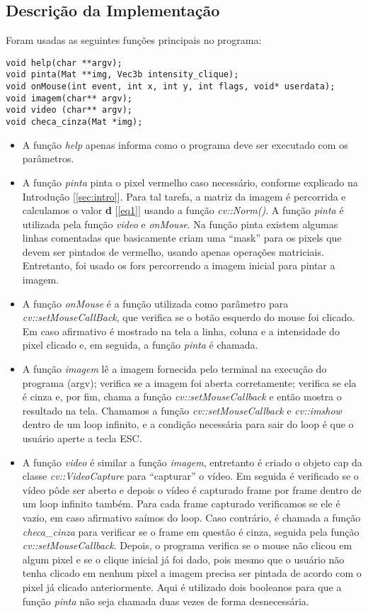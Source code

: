 \documentclass{bmvc2k}
\begin{document}
\subsection{Descrição da Implementação}
Foram usadas as seguintes funções principais no programa:
\begin{lstlisting}
void help(char **argv);
void pinta(Mat **img, Vec3b intensity_clique);
void onMouse(int event, int x, int y, int flags, void* userdata);
void imagem(char** argv);
void video (char** argv);
void checa_cinza(Mat *img);
\end{lstlisting}


\begin{itemize}
\item A função \textit{help} apenas informa como o programa deve ser executado com os parâmetros.
\item A função \textit{pinta} pinta o pixel vermelho caso necessário, conforme explicado na Introdução [\ref{sec:intro}]. Para tal tarefa, a matriz da imagem é percorrida e calculamos o valor \textbf{d} [\ref{eq1}] usando a função \textit{cv::Norm()}. A função \textit{pinta} é utilizada pela função \textit{video} e \textit{onMouse}. Na função pinta existem algumas linhas comentadas que basicamente criam uma ``mask'' para os pixels que devem ser pintados de vermelho, usando apenas operações
matriciais. Entretanto, foi usado os fors percorrendo a imagem inicial para pintar a imagem.
\item A função \textit{onMouse} é a função utilizada como parâmetro para \textit{cv::setMouseCallBack}, que verifica se o botão esquerdo do mouse foi clicado. Em caso afirmativo é mostrado na tela a linha, coluna e a intensidade do pixel clicado e, em seguida, a função \textit{pinta} é chamada.
\item A função \textit{imagem} lê a imagem fornecida pelo terminal na execução do programa (argv); verifica se a imagem foi aberta corretamente; verifica se ela é cinza e, por fim, chama a função \textit{cv::setMouseCallback} e então mostra o resultado na tela. Chamamos a função \textit{cv::setMouseCallback} e \textit{cv::imshow} dentro de um loop infinito, e a condição necessária para sair do loop é que o usuário aperte a tecla ESC.
\item A função \textit{video} é similar a função \textit{imagem}, entretanto é criado o objeto cap da classe \textit{cv::VideoCapture} para ``capturar'' o vídeo. Em seguida é verificado se o vídeo pôde ser aberto e depois o vídeo é capturado frame por frame dentro de um loop infinito também. Para cada frame capturado verificamos se ele é vazio, em caso afirmativo saímos do loop. Caso contrário, é chamada a função \textit{checa\_cinza} para verificar se o frame em questão é cinza, seguida pela função \textit{cv::setMouseCallback}. Depois, o programa verifica se o mouse não clicou em algum pixel e se o clique inicial já foi dado, pois mesmo que o usuário não tenha clicado em nenhum pixel a imagem precisa ser pintada de acordo com o pixel já clicado anteriormente. Aqui é utilizado dois booleanos para que a função \textit{pinta} não seja chamada duas vezes de forma desnecessária.

\end{itemize}
\end{document}
